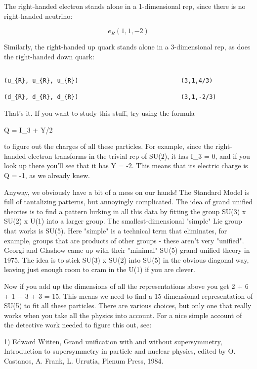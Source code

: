 The right-handed electron stands alone in a 1-dimensional rep, since
there is no right-handed neutrino:


$$

e_{R}                                         (1,1,-2)
$$
    
Similarly, the right-handed up quark stands alone in a 3-dimensional
rep, as does the right-handed down quark:


\begin{verbatim}

(u_{R}, u_{R}, u_{R})                             (3,1,4/3) 

(d_{R}, d_{R}, d_{R})                             (3,1,-2/3)
\end{verbatim}
    
That's it.  If you want to study this stuff, try using the formula

Q = I_{3} + Y/2

to figure out the charges of all these particles.  For example, since
the right-handed electron transforms in the trivial rep of SU(2), it
has I_{3} = 0, and if you look up there you'll see that it has Y = -2.
This means that its electric charge is Q = -1, as we already knew.  

Anyway, we obviously have a bit of a mess on our hands!  The Standard
Model is full of tantalizing patterns, but annoyingly complicated.
The idea of grand unified theories is to find a pattern lurking in all
this data by fitting the group SU(3) x SU(2) x U(1) into a larger
group.  The smallest-dimensional "simple" Lie group that works is
SU(5).  Here "simple" is a technical term that eliminates, for
example, groups that are products of other groups - these aren't very
"unified".  Georgi and Glashow came up with their "minimal" SU(5)
grand unified theory in 1975.  The idea is to stick SU(3) x SU(2) into
SU(5) in the obvious diagonal way, leaving just enough room to cram in
the U(1) if you are clever.

Now if you add up the dimensions of all the representations above you
get 2 + 6 + 1 + 3 + 3 = 15.  This means we need to find a
15-dimensional representation of SU(5) to fit all these particles.
There are various choices, but only one that really works when you
take all the physics into account.  For a nice simple account of the
detective work needed to figure this out, see:

1) Edward Witten, Grand unification with and without supersymmetry,
Introduction to supersymmetry in particle and nuclear physics, edited by
O. Castanos, A. Frank, L. Urrutia, Plenum Press, 1984.

